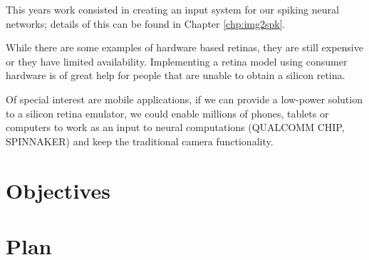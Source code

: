 This years work consisted in creating an input system for our spiking neural networks; details of this can be found in Chapter \ref{chp:img2spk}. 

While there are some examples of hardware based retinas, they are still expensive or they have limited availability. Implementing a retina model using consumer hardware is of great help for people that are unable to obtain a silicon retina.

Of special interest are mobile applications, if we can provide a low-power solution to a silicon retina emulator, we could enable millions of phones, tablets or computers to work as an input to neural computations (QUALCOMM CHIP, SPINNAKER) and keep the traditional camera functionality.



\section{Objectives}
\label{sec:intro:objectives}

\section{Plan}
\label{sec:intro:plan}

